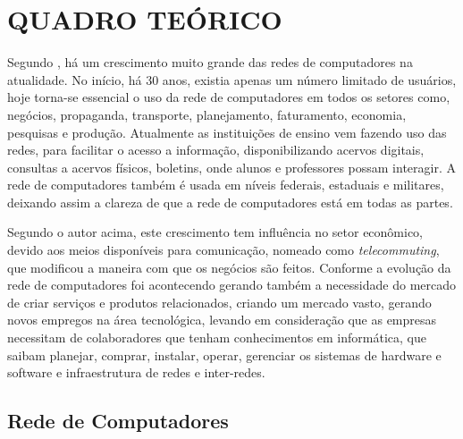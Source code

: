 
\chapter{QUADRO TEÓRICO}


\par Segundo , há um crescimento muito grande das redes
de computadores na atualidade. No início, há 30 anos, existia apenas um número
limitado de usuários, hoje torna-se essencial o uso da rede de
computadores em todos os setores como, negócios, propaganda, transporte,
planejamento, faturamento, economia, pesquisas e produção. Atualmente as
instituições de ensino vem fazendo uso das redes, para facilitar o acesso a
informação, disponibilizando acervos digitais, consultas a acervos físicos,
boletins, onde alunos e professores possam interagir. A rede de computadores
também é usada em níveis federais, estaduais e militares, deixando assim a
clareza de que a rede de computadores está em todas as partes.


\par Segundo o autor acima, este crescimento tem influência no
setor econômico, devido aos meios disponíveis para comunicação, nomeado como
\textit{telecommuting}, que modificou a maneira com que os negócios são feitos.
Conforme a evolução da rede de computadores foi acontecendo gerando também a
necessidade do mercado de criar serviços e produtos relacionados, criando um mercado vasto,
gerando novos empregos na área tecnológica, levando em consideração que as empresas necessitam de colaboradores
que tenham conhecimentos em informática, que saibam planejar, comprar, instalar,
operar, gerenciar os sistemas de hardware e software e infraestrutura de redes e
inter-redes. 

\section{Rede de Computadores}



